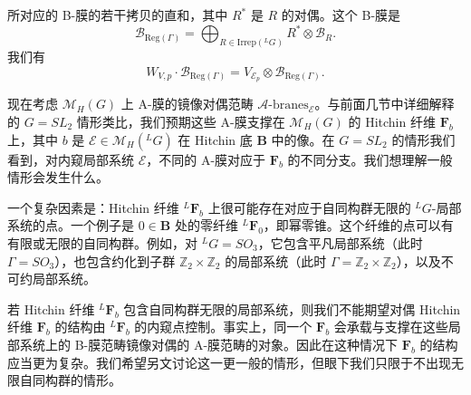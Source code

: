 
所对应的 B-膜的若干拷贝的直和，其中 $R^*$ 是 $R$ 的对偶。这个 B-膜是
\begin{equation}\tag{9.3}
\mathcal{B}_{\mathrm{Reg}(\Gamma)} = \bigoplus_{R\in\mathrm{Irrep}({}^{L}G)}R^*\otimes\mathcal{B}_R.
\end{equation}
我们有
\begin{equation}\tag{9.4}
W_{V,p}\cdot\mathcal{B}_{\mathrm{Reg}(\Gamma)} = V_{\mathcal{E}_p}\otimes\mathcal{B}_{\mathrm{Reg}(\Gamma)}.
\end{equation}

现在考虑 $\mathcal{M}_H(G)$ 上 A-膜的镜像对偶范畴 $\mathcal{A}\text{-branes}_{\mathcal{E}}$。与前面几节中详细解释的 $G=SL_2$ 情形类比，我们预期这些 A-膜支撑在 $\mathcal{M}_H(G)$ 的 Hitchin 纤维 $\boldsymbol{F}_b$ 上，其中 $b$ 是 $\mathcal{E}\in\mathcal{M}_H({}^{L}G)$ 在 Hitchin 底 $\boldsymbol{B}$ 中的像。在 $G=SL_2$ 的情形我们看到，对内窥局部系统 $\mathcal{E}$，不同的 A-膜对应于 $\boldsymbol{F}_b$ 的不同分支。我们想理解一般情形会发生什么。

一个复杂因素是：Hitchin 纤维 ${}^{L}\boldsymbol{F}_b$ 上很可能存在对应于自同构群无限的 ${}^{L}G$-局部系统的点。一个例子是 $0\in\boldsymbol{B}$ 处的零纤维 ${}^{L}\boldsymbol{F}_0$，即幂零锥。这个纤维的点可以有有限或无限的自同构群。例如，对 ${}^{L}G=SO_3$，它包含平凡局部系统（此时 $\Gamma=SO_3$），也包含约化到子群 $\mathbb{Z}_2\times\mathbb{Z}_2$ 的局部系统（此时 $\Gamma=\mathbb{Z}_2\times\mathbb{Z}_2$），以及不可约局部系统。

若 Hitchin 纤维 ${}^{L}\boldsymbol{F}_b$ 包含自同构群无限的局部系统，则我们不能期望对偶 Hitchin 纤维 $\boldsymbol{F}_b$ 的结构由 ${}^{L}\boldsymbol{F}_b$ 的内窥点控制。事实上，同一个 $\boldsymbol{F}_b$ 会承载与支撑在这些局部系统上的 B-膜范畴镜像对偶的 A-膜范畴的对象。因此在这种情况下 $\boldsymbol{F}_b$ 的结构应当更为复杂。我们希望另文讨论这一更一般的情形，但眼下我们只限于不出现无限自同构群的情形。


